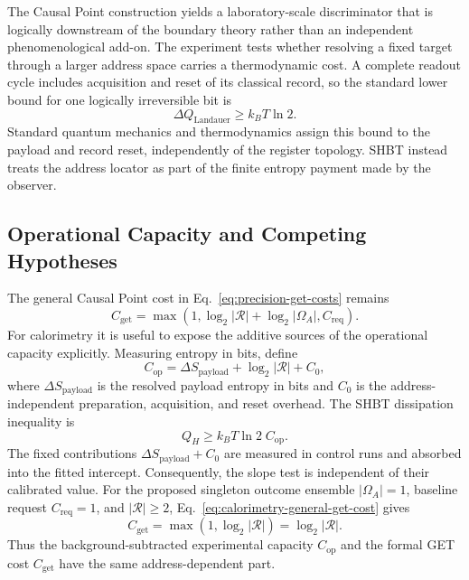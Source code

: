 \documentclass[11pt,letterpaper]{article}
\theoremstyle{plain}
\begin{document}
The Causal Point construction yields a laboratory-scale discriminator that is
logically downstream of the boundary theory rather than an independent
phenomenological add-on.  The experiment tests whether resolving a fixed target
through a larger address space carries a thermodynamic cost.  A complete
readout cycle includes acquisition and reset of its classical record, so the
standard lower bound for one logically irreversible bit is
\begin{equation}
\label{eq:landauer-single-bit}
 \Delta Q_{\text{Landauer}}
 \ge
 k_B T\ln2.
\end{equation}
Standard quantum mechanics and thermodynamics assign this bound to the payload
and record reset, independently of the register topology.  SHBT instead treats
the address locator as part of the finite entropy payment made by the observer.

\subsection{Operational Capacity and Competing Hypotheses}
\label{sec:calorimetry-hypotheses}

The general Causal Point cost in
Eq.~\eqref{eq:precision-get-costs} remains
\begin{equation}
\label{eq:calorimetry-general-get-cost}
 C_{\text{get}}
 =
 \max\!\left(
 1,
 \log_2|\mathcal R|+\log_2|\Omega_A|,
 C_{\text{req}}
 \right).
\end{equation}
For calorimetry it is useful to expose the additive sources of the operational
capacity explicitly.  Measuring entropy in bits, define
\begin{equation}
\label{eq:calorimetry-operational-capacity}
 \boxed{
 C_{\text{op}}
 =
 \Delta S_{\text{payload}}
 +\log_2|\mathcal R|
 +C_0,
 }
\end{equation}
where \(\Delta S_{\text{payload}}\) is the resolved payload entropy in bits and
\(C_0\) is the address-independent preparation, acquisition, and reset
overhead.  The SHBT dissipation inequality is
\begin{equation}
\label{eq:calorimetry-shbt-dissipation-bound}
 \boxed{
 Q_H
 \ge
 k_B T\ln2\; C_{\text{op}}.
 }
\end{equation}
The fixed contributions \(\Delta S_{\text{payload}}+C_0\) are measured in control
runs and absorbed into the fitted intercept.  Consequently, the slope test is
independent of their calibrated value.  For the proposed singleton outcome
ensemble \(|\Omega_A|=1\), baseline request \(C_{\text{req}}=1\), and
\(|\mathcal R|\ge2\), Eq.~\eqref{eq:calorimetry-general-get-cost} gives
\begin{equation}
\label{eq:calorimetry-get-address-specialization}
 C_{\text{get}}
 =
 \max\!\left(1,\log_2|\mathcal R|\right)
 =
 \log_2|\mathcal R|.
\end{equation}
Thus the background-subtracted experimental capacity \(C_{\text{op}}\) and the
formal GET cost \(C_{\text{get}}\) have the same address-dependent part.
\end{document}
